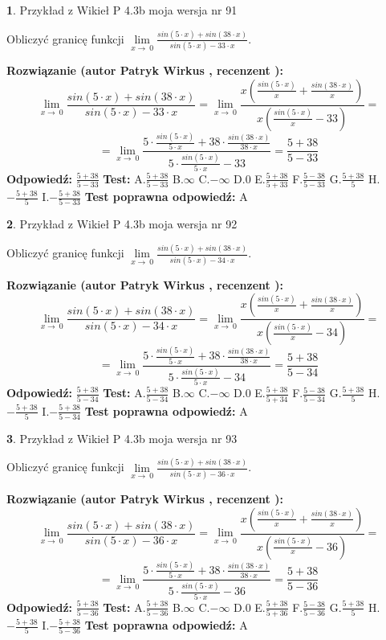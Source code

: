 \documentclass[12pt, a4paper]{article}
\theoremstyle{definition} %
\newtheorem{zad}{}
\newcommand{\zadStart}[1]{\begin{zad}#1\newline}
\newcommand{\zadStop}{\end{zad}}
\newcommand{\rozwStart}[2]{\noindent \textbf{Rozwiązanie (autor #1 , recenzent #2): }\newline}
\newcommand{\rozwStop}{\newline}
\newcommand{\odpStart}{\noindent \textbf{Odpowiedź:}\newline}
\newcommand{\odpStop}{\newline}
\newcommand{\testStart}{\noindent \textbf{Test:}\newline}
\newcommand{\testStop}{\newline}
\newcommand{\kluczStart}{\noindent \textbf{Test poprawna odpowiedź:}\newline}
\newcommand{\kluczStop}{\newline}
\begin{document}
\zadStart{Przykład z Wikieł P 4.3b moja wersja nr 91}


Obliczyć granicę funkcji $\lim\limits_{x\to\ 0}\frac{sin(5 \cdot x)+sin(38 \cdot x)}{sin(5 \cdot x)-33 \cdot x}$.
\zadStop
\rozwStart{Patryk Wirkus}{}
$$\lim\limits_{x\to\ 0}\frac{sin(5 \cdot x)+sin(38 \cdot x)}{sin(5 \cdot x)-33 \cdot x}=\lim\limits_{x\to\ 0}\frac{x(\frac{sin(5 \cdot x)}{x}+\frac{sin(38 \cdot x)}{x})}{x(\frac{sin(5 \cdot x)}{x}-33)}=$$
$$=\lim\limits_{x\to\ 0}\frac{5 \cdot \frac{sin(5 \cdot x)}{5 \cdot x}+38 \cdot \frac{sin(38 \cdot x)}{38 \cdot x}}{5 \cdot \frac{sin(5 \cdot x)}{5 \cdot x}-33}=\frac{5+38}{5-33}$$
\rozwStop
\odpStart
$\frac{5+38}{5-33}$
\odpStop
\testStart
A.$\frac{5+38}{5-33}$
B.$\infty$
C.$-\infty$
D.$0$
E.$\frac{5+38}{5+33}$
F.$\frac{5-38}{5-33}$
G.$\frac{5+38}{5}$
H.$-\frac{5+38}{5}$
I.$-\frac{5+38}{5-33}$
\testStop
\kluczStart
A
\kluczStop



\zadStart{Przykład z Wikieł P 4.3b moja wersja nr 92}


Obliczyć granicę funkcji $\lim\limits_{x\to\ 0}\frac{sin(5 \cdot x)+sin(38 \cdot x)}{sin(5 \cdot x)-34 \cdot x}$.
\zadStop
\rozwStart{Patryk Wirkus}{}
$$\lim\limits_{x\to\ 0}\frac{sin(5 \cdot x)+sin(38 \cdot x)}{sin(5 \cdot x)-34 \cdot x}=\lim\limits_{x\to\ 0}\frac{x(\frac{sin(5 \cdot x)}{x}+\frac{sin(38 \cdot x)}{x})}{x(\frac{sin(5 \cdot x)}{x}-34)}=$$
$$=\lim\limits_{x\to\ 0}\frac{5 \cdot \frac{sin(5 \cdot x)}{5 \cdot x}+38 \cdot \frac{sin(38 \cdot x)}{38 \cdot x}}{5 \cdot \frac{sin(5 \cdot x)}{5 \cdot x}-34}=\frac{5+38}{5-34}$$
\rozwStop
\odpStart
$\frac{5+38}{5-34}$
\odpStop
\testStart
A.$\frac{5+38}{5-34}$
B.$\infty$
C.$-\infty$
D.$0$
E.$\frac{5+38}{5+34}$
F.$\frac{5-38}{5-34}$
G.$\frac{5+38}{5}$
H.$-\frac{5+38}{5}$
I.$-\frac{5+38}{5-34}$
\testStop
\kluczStart
A
\kluczStop



\zadStart{Przykład z Wikieł P 4.3b moja wersja nr 93}


Obliczyć granicę funkcji $\lim\limits_{x\to\ 0}\frac{sin(5 \cdot x)+sin(38 \cdot x)}{sin(5 \cdot x)-36 \cdot x}$.
\zadStop
\rozwStart{Patryk Wirkus}{}
$$\lim\limits_{x\to\ 0}\frac{sin(5 \cdot x)+sin(38 \cdot x)}{sin(5 \cdot x)-36 \cdot x}=\lim\limits_{x\to\ 0}\frac{x(\frac{sin(5 \cdot x)}{x}+\frac{sin(38 \cdot x)}{x})}{x(\frac{sin(5 \cdot x)}{x}-36)}=$$
$$=\lim\limits_{x\to\ 0}\frac{5 \cdot \frac{sin(5 \cdot x)}{5 \cdot x}+38 \cdot \frac{sin(38 \cdot x)}{38 \cdot x}}{5 \cdot \frac{sin(5 \cdot x)}{5 \cdot x}-36}=\frac{5+38}{5-36}$$
\rozwStop
\odpStart
$\frac{5+38}{5-36}$
\odpStop
\testStart
A.$\frac{5+38}{5-36}$
B.$\infty$
C.$-\infty$
D.$0$
E.$\frac{5+38}{5+36}$
F.$\frac{5-38}{5-36}$
G.$\frac{5+38}{5}$
H.$-\frac{5+38}{5}$
I.$-\frac{5+38}{5-36}$
\testStop
\kluczStart
A
\kluczStop
\end{document}
